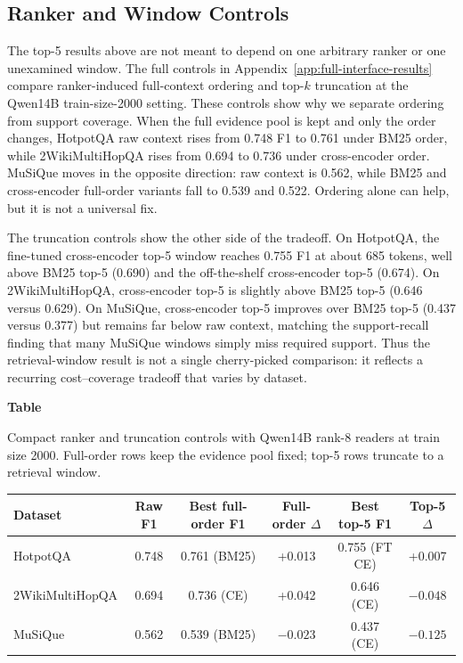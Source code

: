 \documentclass[a4paper,fleqn]{cas-sc}
\newcommand{\sidetablecaption}[2]{%
  \refstepcounter{table}\label{#1}%
  \begingroup
  \raggedright\footnotesize
  \textbf{Table~\thetable}\par
  #2\par
  \endgroup
  \vspace{3pt}
}
\begin{document}
\subsection{Ranker and Window Controls}

The top-5 results above are not meant to depend on one arbitrary ranker or one
unexamined window. The full controls in
Appendix~\ref{app:full-interface-results} compare ranker-induced full-context
ordering and top-$k$ truncation at the Qwen14B train-size-2000 setting. These
controls show why we separate ordering from support coverage. When the full
evidence pool is kept and only the order changes, HotpotQA raw context rises
from 0.748 F1 to 0.761 under BM25 order, while 2WikiMultiHopQA rises from
0.694 to 0.736 under cross-encoder order. MuSiQue moves in the opposite
direction: raw context is 0.562, while BM25 and cross-encoder full-order
variants fall to 0.539 and 0.522. Ordering alone can help, but it is not a
universal fix.

The truncation controls show the other side of the tradeoff. On HotpotQA, the
fine-tuned cross-encoder top-5 window reaches 0.755 F1 at about 685 tokens,
well above BM25 top-5 (0.690) and the off-the-shelf cross-encoder top-5
(0.674). On 2WikiMultiHopQA, cross-encoder top-5 is slightly above BM25 top-5
(0.646 versus 0.629). On MuSiQue, cross-encoder top-5 improves over BM25
top-5 (0.437 versus 0.377) but remains far below raw context, matching the
support-recall finding that many MuSiQue windows simply miss required support.
Thus the retrieval-window result is not a single cherry-picked comparison: it
reflects a recurring cost--coverage tradeoff that varies by dataset.

\begin{center}
\sidetablecaption{tab:ranker-window-compact}{Compact ranker and truncation
controls with Qwen14B rank-8 readers at train size 2000. Full-order rows keep
the evidence pool fixed; top-5 rows truncate to a retrieval window.}
\scriptsize
\setlength{\tabcolsep}{4pt}
\begin{tabular}{lccccc}
\toprule
Dataset & Raw F1 & Best full-order F1 & Full-order $\Delta$ & Best top-5 F1 & Top-5 $\Delta$ \\
\midrule
HotpotQA & 0.748 & 0.761 (BM25) & +0.013 & 0.755 (FT CE) & +0.007 \\
2WikiMultiHopQA & 0.694 & 0.736 (CE) & +0.042 & 0.646 (CE) & $-0.048$ \\
MuSiQue & 0.562 & 0.539 (BM25) & $-0.023$ & 0.437 (CE) & $-0.125$ \\
\bottomrule
\end{tabular}
\end{center}
\end{document}
